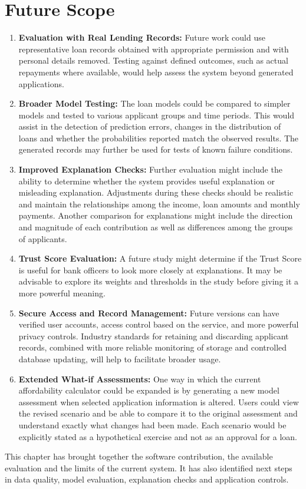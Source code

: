 \section{Future Scope}
\begin{enumerate}
\item \textbf{Evaluation with Real Lending Records:} Future work could use representative loan records obtained with appropriate permission and with personal details removed. Testing against defined outcomes, such as actual repayments where available, would help assess the system beyond generated applications.

\item \textbf{Broader Model Testing:} The loan models could be compared to simpler models and tested to various applicant groups and time periods. This would assist in the detection of prediction errors, changes in the distribution of loans and whether the probabilities reported match the observed results. The generated records may further be used for tests of known failure conditions.

\item \textbf{Improved Explanation Checks:} Further evaluation might include the ability to determine whether the system provides useful explanation or misleading explanation. Adjustments during these checks should be realistic and maintain the relationships among the income, loan amounts and monthly payments. Another comparison for explanations might include the direction and magnitude of each contribution as well as differences among the groups of applicants.

\item \textbf{Trust Score Evaluation:} A future study might determine if the Trust Score is useful for bank officers to look more closely at explanations. It may be advisable to explore its weights and thresholds in the study before giving it a more powerful meaning.

\item \textbf{Secure Access and Record Management:} Future versions can have verified user accounts, access control based on the service, and more powerful privacy controls. Industry standards for retaining and discarding applicant records, combined with more reliable monitoring of storage and controlled database updating, will help to facilitate broader usage.

\item \textbf{Extended What-if Assessments:} One way in which the current affordability calculator could be expanded is by generating a new model assessment when selected application information is altered. Users could view the revised scenario and be able to compare it to the original assessment and understand exactly what changes had been made. Each scenario would be explicitly stated as a hypothetical exercise and not as an approval for a loan.
\end{enumerate}

\par\medskip\noindent
This chapter has brought together the software contribution, the available evaluation and the limits of the current system. It has also identified next steps in data quality, model evaluation, explanation checks and application controls.
